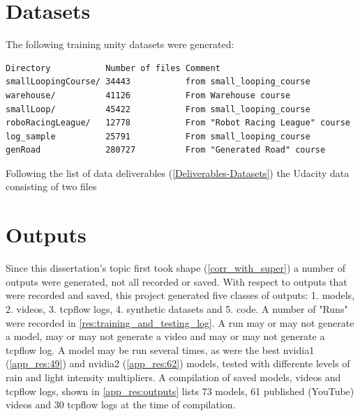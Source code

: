 \section{Datasets}

The following training unity datasets were generated:
\begin{verbatim}
Directory           Number of files Comment
smallLoopingCourse/ 34443           from small_looping_course
warehouse/          41126           From Warehouse course
smallLoop/          45422           From small_looping_course
roboRacingLeague/   12778           From "Robot Racing League" course
log_sample          25791           From small_looping_course
genRoad             280727          From "Generated Road" course
\end{verbatim}


Following the list of data deliverables (\ref{Deliverables-Datasets}) the Udacity data consisting of two files 



\section{Outputs}
Since this dissertation's topic first took shape (\ref{corr_with_super}) a number of outputs were generated, not all recorded or saved. With respect to outputs that were recorded and saved, this project generated five classes of outputs: 1. models, 2. videos, 3. tcpflow logs, 4. synthetic datasets and 5. code. A number of "Runs" were recorded in \ref{res:training_and_testing_log}. A run may or may not generate a model, may or may not generate a video and may or may not generate a tcpflow log. A model may be run several times, as were the best nvidia1 (\ref{app_res:49}) and nvidia2 (\ref{app_res:62}) models, tested with differente levels of rain and light intensity multipliers.
A compilation of saved models, videos and tcpflow logs, shown in \ref{app_res:outputs} lists 73 models, 61 published (YouTube) videos and 30 tcpflow logs at the time of compilation.
